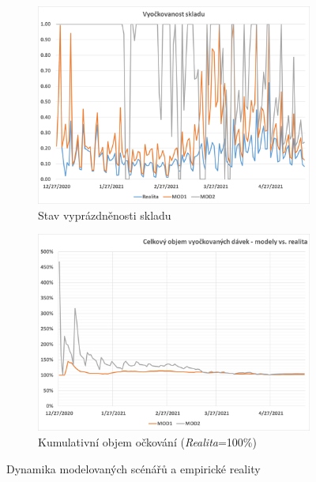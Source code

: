 \begin{figure}
\centering


\begin{subfigure}{0.9\textwidth}
\includegraphics[width=\textwidth]{assets/sklad_vyockovanost}
\caption{Stav vyprázdněnosti skladu}
\label{gr_mod_vyockovanost}
\end{subfigure}


\begin{subfigure}{0.9\textwidth}
\includegraphics[width=\textwidth]{assets/modely_vs_realita}
\caption{Kumulativní objem očkování (\emph{Realita}=100\%)}
\label{gr_models_delta}
\end{subfigure}

\caption{Dynamika modelovaných scénářů a empirické reality}
\label{gr_modelace}

\end{figure}

